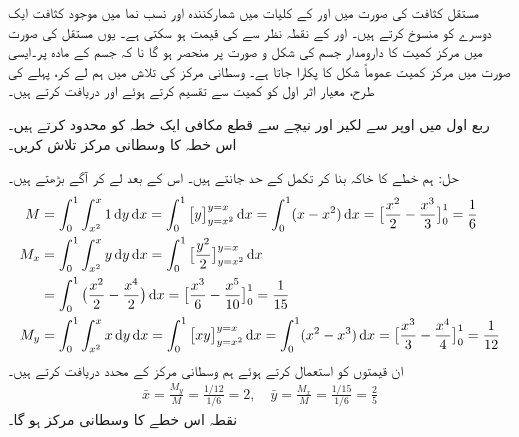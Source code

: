 مستقل کثافت کی صورت میں  اور  کے کلیات میں  شمارکنندہ اور نسب نما   میں موجود کثافت ایک دوسرے کو منسوخ  کرتے ہیں۔     اور   کے نقطہ نظر سے     کی قیمت  ہو سکتی ہے۔ یوں مستقل  کی صورت میں مرکز کمیت کا دارومدار جسم کی شکل و صورت پر منحصر ہو گا نا کہ جسم کے مادہ پر۔ایسی صورت میں    مرکز کمیت  عموماً   شکل کا      پکارا جاتا ہے۔ وسطانی مرکز کی تلاش میں ہم  لے کر، پہلے کی طرح،  معیار اثر اول کو کمیت سے تقسیم کرتے ہوئے   اور  دریافت کرتے ہیں۔

ربع اول میں اوپر سے لکیر   اور نیچے سے قطع مکافی   ایک خطہ کو محدود کرتے ہیں۔ اس خطہ کا وسطانی مرکز تلاش کریں۔

حل:\quad
ہم خطے کا خاکہ بنا کر تکمل کے حد جانتے ہیں۔ اس کے بعد  لے کر آگے بڑھتے ہیں۔
\begin{align*}
M&=\int_0^1\int_{x^2}^x1\dif y\dif x=\int_0^1\big[y\big]_{y=x^2}^{y=x}\dif x=\int_0^1(x-x^2)\dif x=\big[\frac{x^2}{2}-\frac{x^3}{3}\big]_0^1=\frac{1}{6}\\
M_x&=\int_0^1\int_{x^2}^xy\dif y\dif x=\int_0^1\big[\frac{y^2}{2}\big]_{y=x^2}^{y=x}\dif x\\
&=\int_0^1\big(\frac{x^2}{2}-\frac{x^4}{2}\big)\dif x=\big[\frac{x^3}{6}-\frac{x^5}{10}\big]_0^1=\frac{1}{15}\\
M_y&=\int_0^1\int_{x^2}^xx\dif y\dif x=\int_0^1\big[xy\big]_{y=x^2}^{y=x}\dif x=\int_0^1(x^2-x^3)\dif x=\big[\frac{x^3}{3}-\frac{x^4}{4}\big]_0^1=\frac{1}{12}
\end{align*}
ان قیمتوں کو استعمال کرتے ہوئے ہم وسطانی مرکز کے محدد دریافت کرتے ہیں۔
\begin{align*}
\bar{x}=\frac{M_y}{M}=\frac{1/12}{1/6}=2,\quad \bar{y}=\frac{M_x}{M}=\frac{1/15}{1/6}=\frac{2}{5}
\end{align*}
نقطہ  اس خطے کا وسطانی مرکز ہو گا۔
